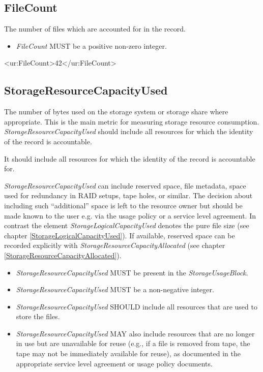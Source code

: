 


\subsection{FileCount}

The number of files which are accounted for in the record.

\begin{itemize}
\item \emph{FileCount} MUST be a positive non-zero integer.
\end{itemize}

\begin{XMLexample}
<ur:FileCount>42</ur:FileCount>
\end{XMLexample}






\subsection{StorageResourceCapacityUsed} \label{StorageResourceCapacityUsed}

The number of bytes used on the storage system or storage share where appropriate. This is the main metric for measuring storage resource consumption. \emph{StorageResourceCapacityUsed} should include all resources for which the identity of the record is accountable.

It should include all resources for which the identity of the record is accountable for.

\emph{StorageResourceCapacityUsed} can include reserved space, file metadata, space used for redundancy in RAID setups, tape holes, or similar. The decision about including such ``additional'' space is left to the resource owner but should be made known to the user e.g. via the usage policy or a service level agreement. In contrast the element \emph{StorageLogicalCapacityUsed} denotes the pure file size (see chapter  \ref{StorageLogicalCapacityUsed}). If available, reserved space can be recorded explicitly with \emph{StorageResourceCapacityAllocated} (see chapter  \ref{StorageResourceCapacityAllocated}).

\begin{itemize}
\item \emph{StorageResourceCapacityUsed} MUST be present in the \emph{StorageUsageBlock}.
\item \emph{StorageResourceCapacityUsed} MUST be a non-negative integer.
\item \emph{StorageResourceCapacityUsed} SHOULD include all resources that are used to store the files. 
\item \emph{StorageResourceCapacityUsed} MAY also include resources that are no longer in use but are unavailable for reuse (e.g., if a file is removed from tape, the tape may not be immediately available for reuse), as documented in the appropriate service level agreement or usage policy documents.
\end{itemize}

